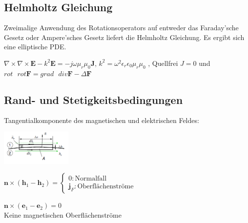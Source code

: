\documentclass[english]{latex4ei/latex4ei_sheet}
\begin{document}
\begin{sectionbox}
\subsection{Helmholtz Gleichung}	
Zweimalige Anwendung des Rotationsoperators auf entweder das Faraday'sche Gesetz oder Ampere'sches Gesetz liefert die Helmholtz Gleichung. Es ergibt sich eine elliptische PDE.

$\nabla\times\nabla\times \mathbf{E} -k^2 \mathbf{E} = -j\omega\mu_r\mu_0 \mathbf{J}$, \quad
$k^2 = \omega^2 \epsilon_r\epsilon_0\mu_r\mu_0$
, Quellfrei $J=0$ und\\
$rot\text{ }rot\mathbf{F} = grad\text{ } div \mathbf{F} - \Delta\mathbf{F}$

\end{sectionbox}
\begin{sectionbox}
	\subsection{Rand- und Stetigkeitsbedingungen}
	Tangentialkomponente des magnetischen und elektrischen Feldes:\\
	\vspace{-0.28cm}
	\begin{center}\includegraphics[width = 3.5cm]{./img/tang_rand.png}\end{center}
	\begin{emphbox}
		$\mathbf{n} \times (\mathbf{h}_1 - \mathbf{h}_2) = 
		\begin{cases}
				0 : \text{Normalfall} \\
			\mathbf{j}_F : \text{Oberflächenströme}
		\end{cases}$
	\end{emphbox}

\begin{emphbox}
	$\mathbf{n} \times (\mathbf{e}_1 -\mathbf{e}_2) = 0$\\
	Keine magnetischen Oberflächenströme
\end{emphbox}


\end{sectionbox}
\end{document}
